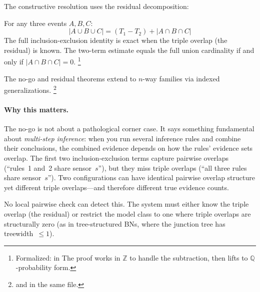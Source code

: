 \documentclass[11pt,openany]{report}
\begin{document}
\noindent
The constructive resolution uses the residual decomposition:

\begin{theorem}
\label{thm:residual-decomp}
For any three events $A, B, C$:
\[
  |A \cup B \cup C| = (T_1 - T_2) + |A \cap B \cap C|
\]
The full inclusion-exclusion identity is exact when the triple
overlap (the residual) is known.  The two-term estimate equals
the full union cardinality if and only if $|A \cap B \cap C| = 0$.%
\footnote{Formalized:
in 
  The proof works in $\mathbb{Z}$ to handle the
subtraction, then lifts to $\mathbb{Q}$-probability form.}
\end{theorem}

\noindent
The no-go and residual theorems extend to $n$-way families via
indexed generalizations.%
\footnote{
and  in the same file.}

\paragraph{Why this matters.}
The no-go is not about a pathological corner case.  It says
something fundamental about \emph{multi-step inference}: when you
run several inference rules and combine their conclusions, the
combined evidence depends on how the rules' evidence sets overlap.
The first two inclusion-exclusion terms capture pairwise overlaps
(``rules~1 and~2 share sensor~$s$''), but they miss triple overlaps
(``all three rules share sensor~$s$'').  Two configurations can
have identical pairwise overlap structure yet different triple
overlaps---and therefore different true evidence counts.

No local pairwise check can detect this.  The system must either
know the triple overlap (the residual) or restrict the model class
to one where triple overlaps are structurally zero (as in
tree-structured BNs, where the junction tree has treewidth~$\le 1$).

\end{document}
